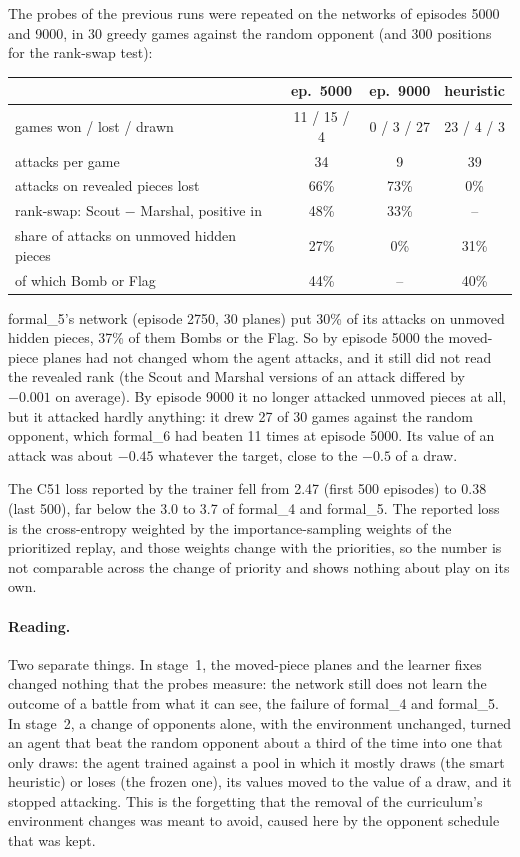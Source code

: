 The probes of the previous runs were repeated on the networks of episodes 5000 and 9000, in 30
greedy games against the random opponent (and 300 positions for the rank-swap test):
\begin{center}
\begin{tabular}{lccc}
\toprule
 & ep.\ 5000 & ep.\ 9000 & heuristic \\
\midrule
games won / lost / drawn                      & 11 / 15 / 4 & 0 / 3 / 27 & 23 / 4 / 3 \\
attacks per game                              & 34          & 9          & 39 \\
attacks on revealed pieces lost               & 66\%        & 73\%       & 0\% \\
rank-swap: Scout $-$ Marshal, positive in     & 48\%        & 33\%       & -- \\
share of attacks on unmoved hidden pieces     & 27\%        & 0\%        & 31\% \\
\quad of which Bomb or Flag                   & 44\%        & --         & 40\% \\
\bottomrule
\end{tabular}
\end{center}
formal\_5's network (episode 2750, 30 planes) put 30\% of its attacks on unmoved hidden pieces,
37\% of them Bombs or the Flag. So by episode 5000 the moved-piece planes had not changed whom the
agent attacks, and it still did not read the revealed rank (the Scout and Marshal versions of an
attack differed by $-0.001$ on average). By episode 9000 it no longer attacked unmoved pieces at
all, but it attacked hardly anything: it drew 27 of 30 games against the random opponent, which
formal\_6 had beaten 11 times at episode 5000. Its value of an attack was about $-0.45$ whatever the
target, close to the $-0.5$ of a draw.

The C51 loss reported by the trainer fell from 2.47 (first 500 episodes) to 0.38 (last 500), far
below the 3.0 to 3.7 of formal\_4 and formal\_5. The reported loss is the cross-entropy weighted by
the importance-sampling weights of the prioritized replay, and those weights change with the
priorities, so the number is not comparable across the change of priority and shows nothing about
play on its own.

\paragraph{Reading.} Two separate things. In stage~1, the moved-piece planes and the learner fixes
changed nothing that the probes measure: the network still does not learn the outcome of a battle
from what it can see, the failure of formal\_4 and formal\_5. In stage~2, a change of opponents
alone, with the environment unchanged, turned an agent that beat the random opponent about a third
of the time into one that only draws: the agent trained against a pool in which it mostly draws
(the smart heuristic) or loses (the frozen one), its values moved to the value of a draw, and it
stopped attacking. This is the forgetting that the removal of the curriculum's environment changes
was meant to avoid, caused here by the opponent schedule that was kept.

